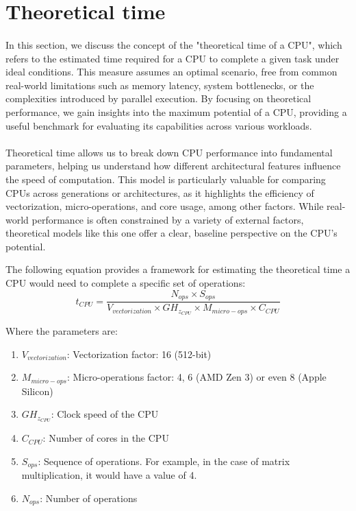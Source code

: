 \section{Theoretical time}

    \paragraph*{}
    In this section, we discuss the concept of the "theoretical time of a CPU", which refers to the 
    estimated time required for a CPU to complete a given task under ideal conditions. This measure 
    assumes an optimal scenario, free from common real-world limitations such as memory latency, 
    system bottlenecks, or the complexities introduced by parallel execution. By focusing on theoretical 
    performance, we gain insights into the maximum potential of a CPU, providing a useful benchmark 
    for evaluating its capabilities across various workloads.
    \par

    \paragraph*{}
    Theoretical time allows us to break down CPU performance into fundamental parameters, helping us 
    understand how different architectural features influence the speed of computation. This model is 
    particularly valuable for comparing CPUs across generations or architectures, as it highlights 
    the efficiency of vectorization, micro-operations, and core usage, among other factors. While 
    real-world performance is often constrained by a variety of external factors, theoretical models 
    like this one offer a clear, baseline perspective on the CPU's potential.
    \par

    The following equation provides a framework for estimating the theoretical time a CPU would need 
    to complete a specific set of operations:
        \[
            t_{CPU}=\frac{N_{ops} \times S_{ops}}{V_{vectorization} \times GH_{z_{CPU}} \times M_{micro-ops} \times C_{CPU}}
        \] 

    Where the parameters are: 
    \begin{enumerate}
        \item \(V_{vectorization}\): Vectorization factor: 16 (512-bit)
        \item \(M_{micro-ops}\): Micro-operations factor: 4, 6 (AMD Zen 3) or even 8 (Apple Silicon)
        \item \(GH_{z_{CPU}}\): Clock speed of the CPU
        \item \(C_{CPU}\): Number of cores in the CPU
        \item \(S_{ops}\): Sequence of operations. For example, in the case of matrix multiplication, it would have a value of 4.
        \item \(N_{ops}\): Number of operations
    \end{enumerate}

\newpage